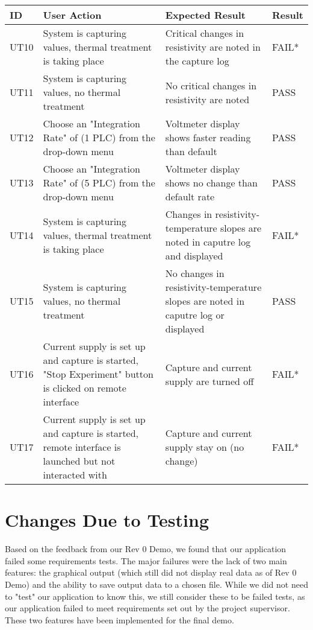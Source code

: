 \documentclass[12pt, titlepage]{article}
\begin{document}
\begin{table}[H]
	\centering
	\begin{tabular}{|p{1cm}|p{5cm}|p{5cm}|p{1.3cm}|}
		\hline
		\textbf{ID} & \textbf{User Action} & \textbf{Expected Result}  & \textbf{Result}\\ \hline
		UT10 & System is capturing values, thermal treatment is taking place & Critical changes in resistivity are noted in the capture log & FAIL*\\ \hline
		UT11 & System is capturing values, no thermal treatment & No critical changes in resistivity are noted & PASS\\ \hline
		UT12 & Choose an "Integration Rate" of (1 PLC) from the drop-down menu & Voltmeter display shows faster reading than default & PASS \\ \hline
		UT13 & Choose an "Integration Rate" of (5 PLC) from the drop-down menu & Voltmeter display shows no change than default rate & PASS\\ \hline
		UT14 & System is capturing values, thermal treatment is taking place & Changes in resistivity-temperature slopes are noted in caputre log and displayed & FAIL* \\ \hline
		UT15 & System is capturing values, no thermal treatment & No changes in resistivity-temperature slopes are noted in caputre log or displayed & PASS \\ \hline
		UT16 & Current supply is set up and capture is started, "Stop Experiment" button is clicked on remote interface & Capture and current supply are turned off & FAIL* \\ \hline
		UT17 & Current supply is set up and capture is started, remote interface is launched but not interacted with & Capture and current supply stay on (no change) & FAIL* \\ \hline
	\end{tabular}
\end{table}

\section{Changes Due to Testing}

\noindent Based on the feedback from our Rev 0 Demo, we found that our application failed some requirements tests. The major failures were the lack of two main features: the graphical output (which still did not display real data as of Rev 0 Demo) and the ability to save output data to a chosen file. While we did not need to "test" our application to know this, we still consider these to be failed tests, as our application failed to meet requirements set out by the project supervisor. These two features have been implemented for the final demo. \\
\end{document}
